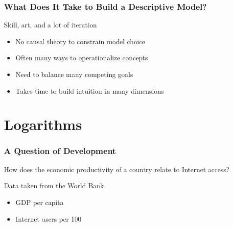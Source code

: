 \documentclass[12pt, block=fill]{beamer}
\begin{document}
\begin{frame}
  \frametitle{What Does It Take to Build a Descriptive Model?}

  Skill, art, and a lot of iteration

  \begin{itemize}
  \item No causal theory to constrain model choice
  \item Often many ways to operationalize concepts
  \item Need to balance many competing goals
  \item Takes time to build intuition in many dimensions
  \end{itemize}

    

\end{frame}



\section{Logarithms}

\begin{frame}
  \frametitle{A Question of Development}
  
  How does the economic productivity of a country relate to Internet
  access?
  
  Data taken from the World Bank
  \begin{itemize}
  \item GDP per capita
  \item Internet users per 100
  \end{itemize}

  
\end{frame}
\end{document}
